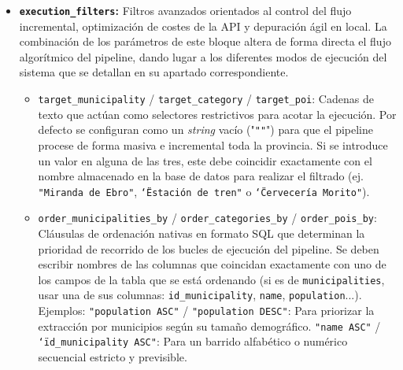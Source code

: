 \begin{itemize}
    \item \textbf{\texttt{execution\_filters}:}
    Filtros avanzados orientados al control del flujo incremental, optimización de costes de la API y depuración ágil en local. La combinación de los parámetros de este bloque altera de forma directa el flujo algorítmico del pipeline, dando lugar a los diferentes modos de ejecución del sistema que se detallan en su apartado correspondiente.
    \begin{itemize}
        \item \texttt{target\_municipality} / \texttt{target\_category} / \texttt{target\_poi}: Cadenas de texto que actúan como selectores restrictivos para acotar la ejecución. Por defecto se configuran como un \textit{string} vacío ("\texttt{""}") para que el pipeline procese de forma masiva e incremental toda la provincia. Si se introduce un valor en alguna de las tres, este debe coincidir exactamente con el nombre almacenado en la base de datos para realizar el filtrado (ej. \texttt{"Miranda de Ebro"}, \texttt{\char`\"Estación de tren"} o \texttt{\char`\"Cervecería Morito"}).
        \item \texttt{order\_municipalities\_by} / \texttt{order\_categories\_by} / \texttt{order\-\_pois\_by}: Cláusulas de ordenación nativas en formato SQL que determinan la prioridad de recorrido de los bucles de ejecución del pipeline. Se deben escribir nombres de las columnas que coincidan exactamente con uno de los campos de la tabla que se está ordenando (si es de \texttt{municipalities}, usar una de sus columnas: \texttt{id\_municipality}, \texttt{name}, \texttt{population}...). Ejemplos: \texttt{"population ASC"} / \texttt{"popula\-tion DESC"}: Para priorizar la extracción por municipios según su tamaño demográfico. \texttt{"name ASC"} / \texttt{\char`\"id\_municipality ASC"}: Para un barrido alfabético o numérico secuencial estricto y previsible.
    \end{itemize}


\end{itemize}
